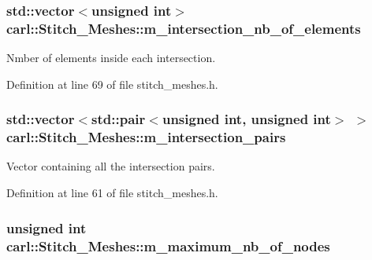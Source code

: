 \subsubsection[{m\+\_\+intersection\+\_\+nb\+\_\+of\+\_\+elements}]{\setlength{\rightskip}{0pt plus 5cm}std\+::vector$<$unsigned int$>$ carl\+::\+Stitch\+\_\+\+Meshes\+::m\+\_\+intersection\+\_\+nb\+\_\+of\+\_\+elements\hspace{0.3cm}{\ttfamily [protected]}}\label{classcarl_1_1_stitch___meshes_a5548b4e0628dcdcb5b1c08eeec124c39}


Nmber of elements inside each intersection. 



Definition at line 69 of file stitch\+\_\+meshes.\+h.

\hypertarget{classcarl_1_1_stitch___meshes_ac2d5619dc617ae411c3c97c130522e29}{}
\subsubsection[{m\+\_\+intersection\+\_\+pairs}]{\setlength{\rightskip}{0pt plus 5cm}std\+::vector$<$std\+::pair$<$unsigned int, unsigned int$>$ $>$ carl\+::\+Stitch\+\_\+\+Meshes\+::m\+\_\+intersection\+\_\+pairs\hspace{0.3cm}{\ttfamily [protected]}}\label{classcarl_1_1_stitch___meshes_ac2d5619dc617ae411c3c97c130522e29}


Vector containing all the intersection pairs. 



Definition at line 61 of file stitch\+\_\+meshes.\+h.

\hypertarget{classcarl_1_1_stitch___meshes_a5583a82a08d9560d4b7bf2c1c3c9b815}{}
\subsubsection[{m\+\_\+maximum\+\_\+nb\+\_\+of\+\_\+nodes}]{\setlength{\rightskip}{0pt plus 5cm}unsigned int carl\+::\+Stitch\+\_\+\+Meshes\+::m\+\_\+maximum\+\_\+nb\+\_\+of\+\_\+nodes\hspace{0.3cm}{\ttfamily [protected]}}\label{classcarl_1_1_stitch___meshes_a5583a82a08d9560d4b7bf2c1c3c9b815}


